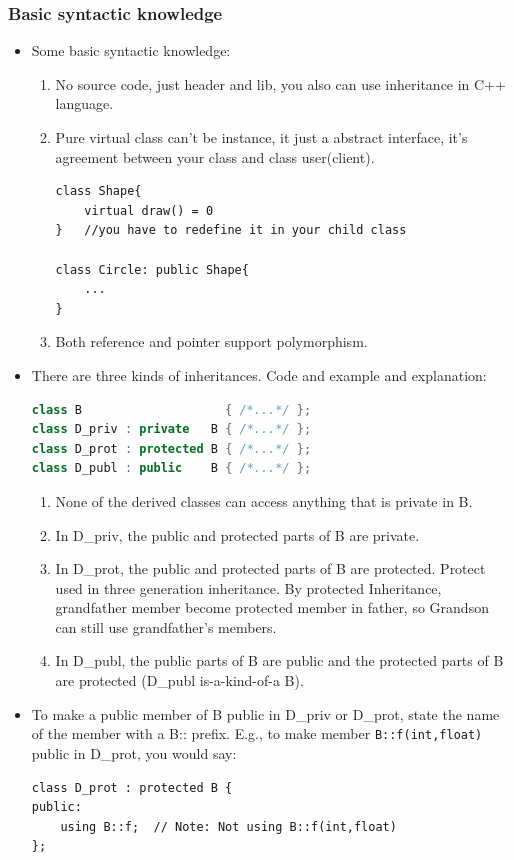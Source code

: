 \documentclass[a4paper,11pt,twoside]{book}
\begin{document}
\subsubsection{Basic syntactic knowledge}
\begin{itemize}

	\item Some basic syntactic knowledge:
	\begin{enumerate}
		\item No source code, just header and lib, you also can use inheritance in C++ language.
		
		\item Pure virtual class can't be instance, it just a abstract interface, it's agreement between your class and class user(client).
\begin{lstlisting}[numbers=none]
class Shape{
	virtual draw() = 0 
}	//you have to redefine it in your child class
			
class Circle: public Shape{
	...
}
\end{lstlisting}
		
		\item Both reference and pointer support polymorphism.
	\end{enumerate}
	
	\item 	There are three kinds of inheritances. Code and example and explanation:
\begin{lstlisting}[frame=single, language=c++]
class B                    { /*...*/ };
class D_priv : private   B { /*...*/ };
class D_prot : protected B { /*...*/ };
class D_publ : public    B { /*...*/ };
\end{lstlisting}
	
	\begin{enumerate}
		\item None of the derived classes can access anything that is private in B.
		
		\item In D\_priv, the public and protected parts of B are private.
		
		\item In D\_prot, the public and protected parts of B are protected. Protect used in three generation inheritance. By protected Inheritance, grandfather member become protected member in father, so Grandson can still use grandfather's members.
		
		\item In D\_publ, the public parts of  B are public and the protected parts of B are protected (D\_publ is-a-kind-of-a B).
		
	\end{enumerate}

	\item To make a public member of B public in D\_priv or D\_prot, state the name of the member with a B:: prefix. E.g., to make member \texttt{B::f(int,float)} public in D\_prot, you would say:
\begin{lstlisting}[numbers=none]
class D_prot : protected B {
public:
	using B::f;  // Note: Not using B::f(int,float)
};
\end{lstlisting}
\end{itemize}
\end{document}

